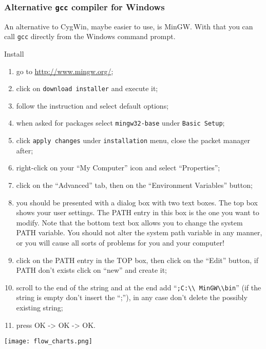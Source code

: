 \begin{frame}
  \frametitle{Alternative \texttt{gcc} compiler for Windows}
  An alternative to CygWin, maybe easier to use, is
  \alert{MinGW}. With that you can call \texttt{gcc} directly from the
  Windows command prompt.
  \begin{block}{Install}
    \tiny
    \begin{enumerate}
    \item go to \alert{\url{http://www.mingw.org/}};
    \item click on \alert{\texttt{download installer}} and execute it;
    \item follow the instruction and select default options;
    \item when asked for packages select \alert{\texttt{mingw32-base}}
      under \texttt{Basic Setup};
    \item click \alert{\texttt{apply changes}} under
      \alert{\texttt{installation}} menu, close the packet manager after;
    \item right-click on your ``My Computer'' icon and select
      ``Properties'';
    \item click on the ``Advanced'' tab, then on the ``Environment
      Variables'' button;
    \item you should be presented with a dialog box with two text
      boxes. The top box shows your user settings. The PATH entry in
      this box is the one you want to modify. Note that the bottom
      text box allows you to change the system PATH variable. You
      should not alter the system path variable in any manner, or you
      will cause all sorts of problems for you and your computer!
    \item click on the PATH entry in the TOP box, then click on the
      ``Edit'' button, if PATH don't exists click on ``new'' and create
      it;
    \item scroll to the end of the string and at the end add
      ``\alert{\texttt{;C:\textbackslash\textbackslash
          MinGW\textbackslash\textbackslash bin}}'' (if the string is empty don't
      insert the ``;''), in any case don't delete the possibly existing
      string;
    \item press OK -> OK -> OK.
    \end{enumerate}
  \end{block}
\end{frame}

\begin{frame}
  \begin{center}
    \texttt{[image: flow\_charts.png]}
  \end{center}
\end{frame}


